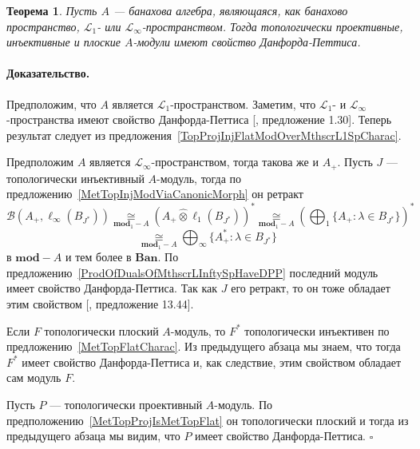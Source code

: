 \documentclass[12pt]{article}
\newcommand{\projtens}{\mathbin{\widehat{\otimes}}}
\newcommand{\isom}[1]{\mathop{\mathbin{\cong}}\limits_{#1}}
\newtheorem{theorem}{Теорема}[section]
\renewenvironment{proof}{\paragraph{Доказательство.}}{\hfill$\square$\medskip}
\begin{document}
\begin{theorem}\label{TopProjInjFlatModOverMthscrL1OrLInftySpHaveDPP} Пусть $A$
    --- банахова алгебра, являющаяся, как банахово пространство,
    $\mathscr{L}_1$- или $\mathscr{L}_\infty$-пространством. Тогда топологически
    проективные, инъективные и плоские $A$-модули имеют свойство
    Данфорда-Петтиса.
\end{theorem}
\begin{proof} Предположим, что $A$ является $\mathscr{L}_1$-пространством.
    Заметим, что $\mathscr{L}_1$- и $\mathscr{L}_\infty$-пространства имеют
    свойство Данфорда-Петтиса [\cite{BourgNewClOfLpSp}, предложение 1.30].
    Теперь результат следует из
    предложения~\ref{TopProjInjFlatModOverMthscrL1SpCharac}.

    Предположим $A$ является $\mathscr{L}_\infty$-пространством, тогда такова же
    и $A_+$. Пусть $J$ --- топологически инъективный $A$-модуль, тогда по
    предложению~\ref{MetTopInjModViaCanonicMorph} он ретракт
    $$
        \mathcal{B}(A_+,\ell_\infty(B_{J^*}))
        \isom{\mathbf{mod}_1-A}{(A_+\projtens\ell_1(B_{J^*}))}^*
        \isom{\mathbf{mod}_1-A}
        {\left(\bigoplus\nolimits_1 \{ A_+:\lambda\in B_{J^*} \}\right)}^*
    $$
    $$
        \isom{\mathbf{mod}_1-A}
        \bigoplus\nolimits_\infty \{ A_+^*:\lambda\in B_{J^*} \}
    $$
    в $\mathbf{mod}-A$ и тем более в $\mathbf{Ban}$. По
    предложению~\ref{ProdOfDualsOfMthscrLInftySpHaveDPP} последний модуль имеет
    свойство Данфорда-Петтиса. Так как $J$ его ретракт, то он тоже обладает этим
    свойством [\cite{FabHabBanSpTh}, предложение 13.44].

    Если $F$ топологически плоский $A$-модуль, то $F^*$ топологически инъективен
    по предложению~\ref{MetTopFlatCharac}. Из предыдущего абзаца мы знаем, что
    тогда $F^*$ имеет свойство Данфорда-Петтиса и, как следствие, этим свойством
    обладает сам модуль $F$.

    Пусть $P$ --- топологически проективный $A$-модуль. По
    предположению~\ref{MetTopProjIsMetTopFlat} он топологически плоский и тогда
    из предыдущего абзаца мы видим, что $P$ имеет свойство Данфорда-Петтиса.
\end{proof}
\end{document}
